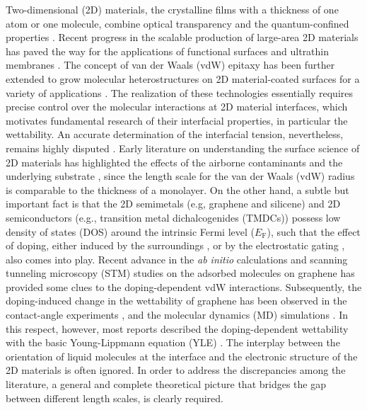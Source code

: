 \documentclass[journal=ancac3,manuscript=article,email=true,hyperref=true,keywords=true]{achemso}
\begin{document}
Two-dimensional (2D) materials, the crystalline films with a thickness
of one atom or one molecule, combine optical transparency and the
quantum-confined properties
\cite{Novoselov_2005,Mas_Ballest__2011,Novoselov_2016}.  Recent progress
in the scalable production of large-area 2D materials
\cite{Boott_2015,Li_2016} has paved the way for the applications of
functional surfaces and ultrathin membranes
\cite{Prasai_2012,Feng_2016,Rafiee_2010,Yin_2014,Surwade_2015,Hern_ndez_2013}.
The concept of van der Waals (vdW) epitaxy has been further extended
to grow molecular heterostructures on 2D material-coated surfaces for
a variety of applications
\cite{Shi_2012_epitaxy_graphene,Kim_2017_remote_epitaxy,Novoselov_2016}. The
realization of these technologies essentially requires precise control
over the molecular interactions at 2D material interfaces, which
motivates fundamental research of their interfacial properties, in
particular the wettability.  An accurate determination of the
interfacial tension, nevertheless, remains highly disputed
\cite{taherian2013what,Kozbial_2015,Parobek_2015,Govind_Rajan_2016}. Early
literature on understanding the surface science of 2D materials has
highlighted the effects of the airborne contaminants
\cite{li_effect_2013,Xu_2013_withwhat,kozbial_study_2014,Kozbial_2015,Chow_2015}
and the underlying substrate
\cite{raj_wettability_2013,rafiee_wetting_2012,shih_breakdown_2012,shih_wetting_2013},
since the length scale for the van der Waals (vdW) radius is
comparable to the thickness of a monolayer. On the other hand, a
subtle but important fact is that the 2D semimetals (e.g, graphene and
silicene) and 2D semiconductors (e.g., transition metal
dichalcogenides (TMDCs)) possess low density of states (DOS) around
the intrinsic Fermi level (\(E_{\mathrm{F}}\)), such that the effect of
doping, either induced by the surroundings
\cite{Chen_2013,Varchon_2007,Giovannetti_2008}, or by the electrostatic
gating \cite{Das_2008,Perera_2013}, also comes into play. Recent advance
in the \textit{ab initio} calculations and scanning tunneling
microscopy (STM) studies on the adsorbed molecules on graphene
\cite{Muruganathan_2015,Huttmann_2015} has provided some clues to the
doping-dependent vdW interactions. Subsequently, the doping-induced
change in the wettability of graphene has been observed in the
contact-angle experiments
\cite{hong_mechanism_2016,goniszewski_correlation_2016,ashraf_doping-induced_2016},
and the molecular dynamics (MD) simulations
\cite{ostrowski_tunable_2014,ren_interfacial_2015,Taherian_2015,daub_electrowetting_2007}. In
this respect, however, most reports described the doping-dependent
wettability with the basic Young-Lippmann equation (YLE)
\cite{Lippmann_1875}. The interplay between the orientation of
liquid molecules at the interface \cite{Shen_2006} and the electronic
structure of the 2D materials is often ignored. In order to address
the discrepancies among the literature, a general and complete
theoretical picture that bridges the gap between different length
scales, is clearly required.
\end{document}
